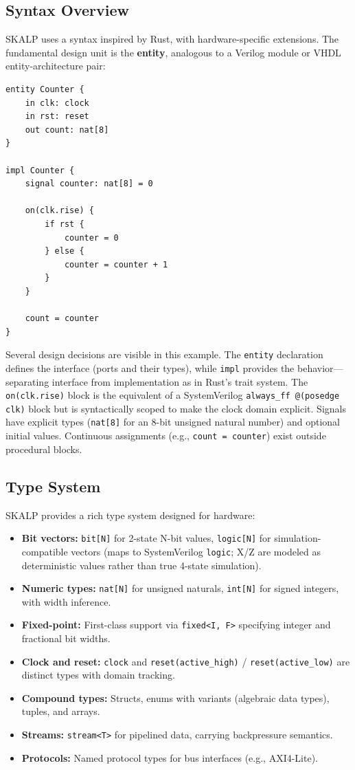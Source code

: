 \documentclass[conference]{IEEEtran}
\begin{document}
\subsection{Syntax Overview}

SKALP uses a syntax inspired by Rust, with hardware-specific extensions. The fundamental design unit is the \textbf{entity}, analogous to a Verilog module or VHDL entity-architecture pair:

\begin{lstlisting}
entity Counter {
    in clk: clock
    in rst: reset
    out count: nat[8]
}

impl Counter {
    signal counter: nat[8] = 0

    on(clk.rise) {
        if rst {
            counter = 0
        } else {
            counter = counter + 1
        }
    }

    count = counter
}
\end{lstlisting}

Several design decisions are visible in this example. The \texttt{entity} declaration defines the interface (ports and their types), while \texttt{impl} provides the behavior---separating interface from implementation as in Rust's trait system. The \texttt{on(clk.rise)} block is the equivalent of a SystemVerilog \texttt{always\_ff @(posedge clk)} block but is syntactically scoped to make the clock domain explicit. Signals have explicit types (\texttt{nat[8]} for an 8-bit unsigned natural number) and optional initial values. Continuous assignments (e.g., \texttt{count = counter}) exist outside procedural blocks.

\subsection{Type System}

SKALP provides a rich type system designed for hardware:

\begin{itemize}
  \item \textbf{Bit vectors:} \texttt{bit[N]} for 2-state N-bit values, \texttt{logic[N]} for simulation-compatible vectors (maps to SystemVerilog \texttt{logic}; X/Z are modeled as deterministic values rather than true 4-state simulation).
  \item \textbf{Numeric types:} \texttt{nat[N]} for unsigned naturals, \texttt{int[N]} for signed integers, with width inference.
  \item \textbf{Fixed-point:} First-class support via \texttt{fixed<I, F>} specifying integer and fractional bit widths.
  \item \textbf{Clock and reset:} \texttt{clock} and \texttt{reset(active\_high)} / \texttt{reset(active\_low)} are distinct types with domain tracking.
  \item \textbf{Compound types:} Structs, enums with variants (algebraic data types), tuples, and arrays.
  \item \textbf{Streams:} \texttt{stream<T>} for pipelined data, carrying backpressure semantics.
  \item \textbf{Protocols:} Named protocol types for bus interfaces (e.g., AXI4-Lite).
\end{itemize}
\end{document}

